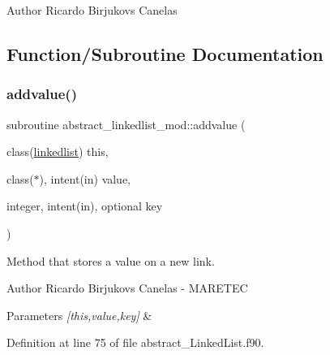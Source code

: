 \begin{DoxyAuthor}{Author}
Ricardo Birjukovs Canelas 
\end{DoxyAuthor}


\subsection{Function/\+Subroutine Documentation}
\mbox{\label{namespaceabstract__linkedlist__mod_a1075e2f234dacc9daf8407e14fac0929}} 
\subsubsection{\texorpdfstring{addvalue()}{addvalue()}}
{\footnotesize\ttfamily subroutine abstract\+\_\+linkedlist\+\_\+mod\+::addvalue (\begin{DoxyParamCaption}\item[{class(\mbox{\hyperlink{structabstract__linkedlist__mod_1_1linkedlist}{linkedlist}})}]{this,  }\item[{class($\ast$), intent(in)}]{value,  }\item[{integer, intent(in), optional}]{key }\end{DoxyParamCaption})\hspace{0.3cm}{\ttfamily [private]}}



Method that stores a value on a new link. 

\begin{DoxyAuthor}{Author}
Ricardo Birjukovs Canelas -\/ M\+A\+R\+E\+T\+EC 
\end{DoxyAuthor}

\begin{DoxyParams}{Parameters}
{\em \mbox{[}this,value,key\mbox{]}} & \\
\hline
\end{DoxyParams}


Definition at line 75 of file abstract\+\_\+\+Linked\+List.\+f90.


